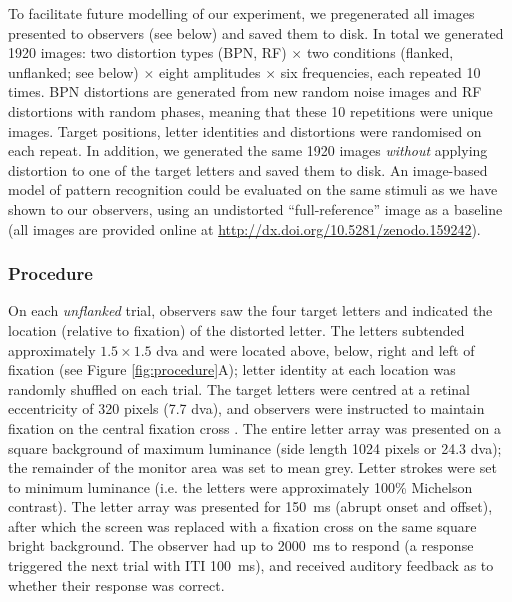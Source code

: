 \documentclass[doc, 11pt,a4paper,natbib]{apa6}\usepackage[]{graphicx}\usepackage[]{color}
\begin{document}
To facilitate future modelling of our experiment, we pregenerated all images presented to observers (see below) and saved them to disk.
In total we generated 1920 images: two distortion types (BPN, RF) $\times$ two conditions (flanked, unflanked; see below) $\times$ eight amplitudes $\times$ six frequencies, each repeated 10 times.
BPN distortions are generated from new random noise images and RF distortions with random phases, meaning that these 10 repetitions were unique images.
Target positions, letter identities and distortions were randomised on each repeat.
In addition, we generated the same 1920 images \textit{without} applying distortion to one of the target letters and saved them to disk.
An image-based model of pattern recognition could be evaluated on the same stimuli as we have shown to our observers, using an undistorted ``full-reference'' image as a baseline (all images are provided online at \url{http://dx.doi.org/10.5281/zenodo.159242}).

\subsubsection{Procedure}

On each \textit{unflanked} trial, observers saw the four target letters and indicated the location (relative to fixation) of the distorted letter.
The letters subtended approximately $1.5 \times 1.5$ dva and were located above, below, right and left of fixation (see Figure \ref{fig:procedure}A); letter identity at each location was randomly shuffled on each trial.
The target letters were centred at a retinal eccentricity of 320 pixels (7.7 dva), and observers were instructed to maintain fixation on the central fixation cross \citep[best for steady fixation from][]{thaler_what_2013}.
The entire letter array was presented on a square background of maximum luminance (side length 1024 pixels or 24.3 dva); the remainder of the monitor area was set to mean grey.
Letter strokes were set to minimum luminance (i.e. the letters were approximately 100\% Michelson contrast).
The letter array was presented for 150~ms (abrupt onset and offset), after which the screen was replaced with a fixation cross on the same square bright background.
The observer had up to 2000~ms to respond (a response triggered the next trial with ITI 100~ms), and received auditory feedback as to whether their response was correct.
\end{document}

